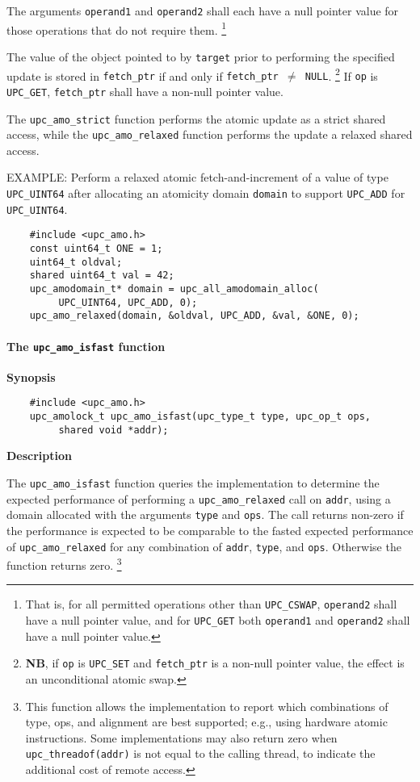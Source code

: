 \np The arguments {\tt operand1} and {\tt operand2} shall each have a null
    pointer value for those operations that do not require them.%
    \footnote{That is, for all permitted operations other than {\tt UPC\_CSWAP},
    {\tt operand2} shall have a null pointer value, and for {\tt UPC\_GET}
    both {\tt operand1} and {\tt operand2} shall have a null pointer value.}

\np The value of the object pointed to by {\tt target} prior to performing
    the specified update is stored in {\tt fetch\_ptr} if and only if
    {\tt fetch\_ptr $\neq$ NULL}.%
    \footnote{{\bf NB}, if {\tt op} is {\tt UPC\_SET} and {\tt *fetch\_ptr} is
      a non-null pointer value, the effect is an unconditional atomic swap.}
    If {\tt op} is {\tt UPC\_GET}, {\tt *fetch\_ptr} shall have a non-null
    pointer value.

\np The {\tt upc\_amo\_strict} function performs the atomic update as a strict
    shared access, while the {\tt upc\_amo\_relaxed} function performs the
    update a relaxed shared access.

\np EXAMPLE: Perform a relaxed atomic fetch-and-increment of a value of type
    {\tt UPC\_UINT64} after allocating an atomicity domain {\tt domain} to
    support {\tt UPC\_ADD} for {\tt UPC\_UINT64}.
\begin{verbatim}
    #include <upc_amo.h>
    const uint64_t ONE = 1;
    uint64_t oldval;
    shared uint64_t val = 42;
    upc_amodomain_t* domain = upc_all_amodomain_alloc(
         UPC_UINT64, UPC_ADD, 0);
    upc_amo_relaxed(domain, &oldval, UPC_ADD, &val, &ONE, 0);
\end{verbatim}

\paragraph{The {\tt upc\_amo\_isfast} function}

{\bf Synopsis}

\npf\vspace{-1.8em}
\begin{verbatim}
    #include <upc_amo.h>
    upc_amolock_t upc_amo_isfast(upc_type_t type, upc_op_t ops,
         shared void *addr);
\end{verbatim}

{\bf Description}

\np The {\tt upc\_amo\_isfast} function queries the implementation to determine
    the expected performance of performing a {\tt upc\_amo\_relaxed} call on
    {\tt addr}, using a domain allocated with the arguments {\tt type} and
    {\tt ops}.  The call returns non-zero if the performance is expected to be
    comparable to the fasted expected performance of {\tt upc\_amo\_relaxed}
    for any combination of {\tt addr}, {\tt type}, and {\tt ops}.  Otherwise
    the function returns zero.%
    \footnote{This function allows the implementation to report which
    combinations of type, ops, and alignment are best supported; e.g., using
    hardware atomic instructions.  Some implementations may also return zero
    when {\tt upc\_threadof(addr)} is not equal to the calling thread, to
    indicate the additional cost of remote access.}
